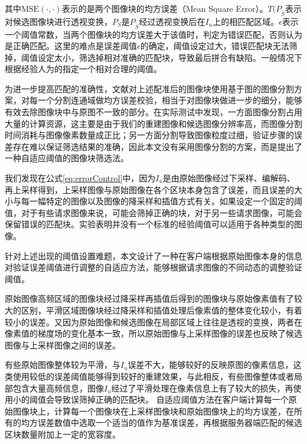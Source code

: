 \documentclass[UTF8]{csoarticle}
\begin{document}
其中\(\text{MSE}(\cdot,\cdot)\)表示的是两个图像块的均方误差（Mean Square Error）。\(T(P_{\tilde{S}}\)表示对候选图像块进行透视变换，\(P_{S}\)是\(P_{\tilde{S}}\)经过透视变换后在\(I_u\)上的相匹配区域。\(\epsilon\)表示一个阈值常数，当两个图像块的均方误差大于该值时，判定为错误匹配，否则认为是正确匹配。这里的难点是误差阈值\(\epsilon\)的确定，阈值设定过大，错误匹配块无法筛掉，阈值设定太小，筛选掉相对准确的匹配块，导致最后拼合有缺陷。一般情况下根据经验人为的指定一个相对合理的阈值。

为进一步提高匹配的准确性，文献\cite{Dai:2012vn}对上述配准后的图像块使用基于图的图像分割方案，对每一个分割连通域做均方误差校验，相当于对图像块做进一步的细分，能够有效去除图像块中与原图不一致的部分。在实际测试中发现，一方面图像分割占用大量的计算资源，这主要是由于我们的重建图像和候选图像分辨率高，而图像分割时间消耗与图像像素数量成正比；另一方面分割导致图像粒度过细，验证步骤的误差存在难以保证筛选结果的准确，因此本文没有采用图像分割的方案，而是提出了一种自适应阈值的图像块筛选法。

我们发现在公式\ref{eq:errorControl}中，因为\(I_u\)是由原始图像经过下采样、编解码、再上采样得到，上采样图像与原始图像在各个区块本身包含了误差，而且误差的大小与每一幅特定的图像以及图像的降采样和插值方式有关。如果设定一个固定的阈值，对于有些请求图像来说，可能会筛掉正确的块，对于另一些请求图像，可能会保留错误的匹配块。实验表明并没有一个标准的经验阈值可以适用于各种类型的图像。

针对上述出现的阈值设置难题，本文设计了一种在客户端根据原始图像本身的信息对验证误差阈值进行调整的自适应方法，能够根据请求图像的不同动态的调整验证阈值。

原始图像高频区域的图像块经过降采样再插值后得到的图像块与原始像素值有了较大的区别，平滑区域图像块经过降采样和插值处理后像素值的整体变化较小，有着较小的误差。又因为原始图像和候选图像在局部区域上往往是透视的变换，两者在像素值的梯度场的变化基本一致，所以原始图像与上采样图像的误差也反映了候选图像与上采样图像之间的误差。

有些原始图像整体较为平滑，与\(I_u\)误差不大，能够较好的反映原图的像素信息，这类使用较低的误差阈值能够得到较好的重建效果，与此相反，有些图像整体或者局部包含大量高频信息，图像\(I_u\)经过了平滑处理在像素信息上有了较大的损失，再使用小的阈值会导致误筛掉正确的匹配块。
自适应阈值方法在客户端计算每一个原始图像块上，计算每一个图像块在上采样图像块和原始图像块上的均方误差，在所有的均方误差数值中选取一个适当的值作为基准误差，再根据服务器端匹配的候选区块数量附加上一定的宽容度。
\end{document}
